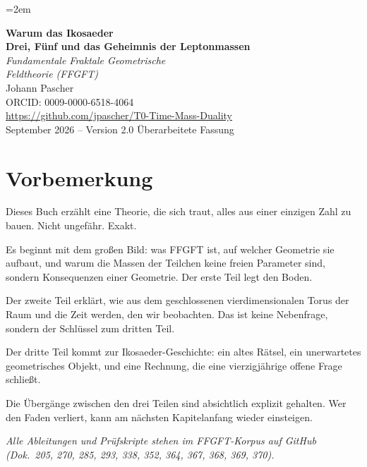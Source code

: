 \documentclass[12pt,oneside]{book}
\begin{document}
\hfuzz=3pt\vfuzz=3pt
\emergencystretch=2em
\sloppy

\frontmatter
\pagestyle{fancy}
\makeatletter\let\ps@plain\ps@fancy\makeatother
\begin{titlepage}
  \centering\vspace*{1.5cm}
  {\Huge\bfseries\color{ffgblue}Warum das Ikosaeder}\\[0.6cm]
  {\Large\bfseries\color{ffgblue!70}Drei, Fünf und das Geheimnis der Leptonmassen}\\[1.5cm]
  {\LARGE\itshape Fundamentale Fraktale Geometrische\\[0.2cm]Feldtheorie (FFGFT)}\\[2cm]
  {\large Johann Pascher}\\[0.3cm]
  {\normalsize ORCID: 0009-0000-6518-4064}\\[0.3cm]
  {\normalsize\url{https://github.com/jpascher/T0-Time-Mass-Duality}}\\[1.5cm]
  {\normalsize September 2026 -- Version 2.0}\vfill
  {\small Überarbeitete Fassung}
\end{titlepage}
\tableofcontents

\chapter*{Vorbemerkung}

Dieses Buch erzählt eine Theorie, die sich traut, alles aus einer einzigen Zahl zu bauen. Nicht ungefähr. Exakt.

Es beginnt mit dem großen Bild: was FFGFT ist, auf welcher Geometrie sie aufbaut, und warum die Massen der Teilchen keine freien Parameter sind, sondern Konsequenzen einer Geometrie. Der erste Teil legt den Boden.

Der zweite Teil erklärt, wie aus dem geschlossenen vier\-dimen\-sio\-nalen Torus der Raum und die Zeit werden, den wir beobachten. Das ist keine Nebenfrage, sondern der Schlüssel zum dritten Teil.

Der dritte Teil kommt zur Ikosaeder-Geschichte: ein altes Rätsel, ein unerwartetes geometrisches Objekt, und eine Rechnung, die eine vierzigjährige offene Frage schließt.

Die Übergänge zwischen den drei Teilen sind absichtlich explizit gehalten. Wer den Faden verliert, kann am nächsten Kapitelanfang wieder einsteigen.

\vspace{0.5cm}
\noindent\textit{Alle Ableitungen und Prüfskripte stehen im FFGFT-Korpus auf GitHub (Dok.~205, 270, 285, 293, 338, 352, 364, 367, 368, 369, 370).}
\end{document}
